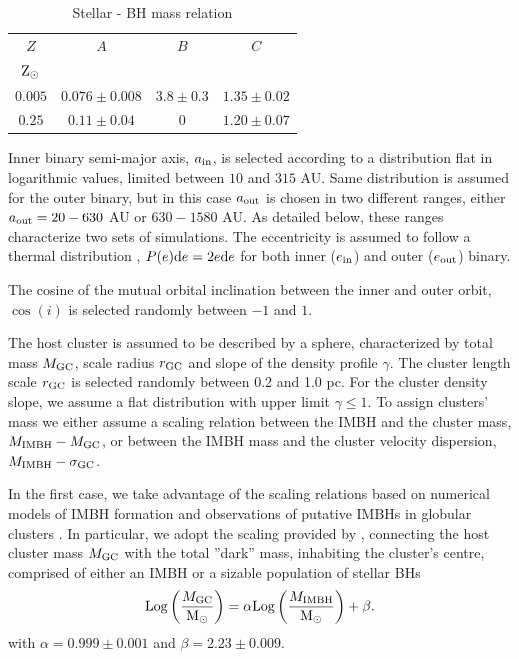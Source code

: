 \documentclass[twocolumn]{aastex62}
\newcommand{\Log}{{\rm Log}}
\newcommand{\Ms}{{\rm M}_\odot}
\newcommand{\Zs}{{\rm Z}_\odot}
\newcommand{\gc}{{\rm GC}}
\newcommand{\ibh}{{\rm IMBH}}
\newcommand{\inn}{{\rm in}}
\newcommand{\out}{{\rm out}}
\begin{document}
\begin{table}
    \centering
    \caption{Stellar - BH mass relation}
    \begin{tabular}{cccc}
        \hline
        \hline
        $Z$ & $A$ & $B$ & $C$ \\
        $\Zs$   &  & &  \\
    \hline    
        $0.005 $& $0.076\pm0.008$ & $3.8\pm0.3$ & $1.35\pm0.02$\\
        $0.25$  & $0.11\pm0.04$   & $0  $       & $1.20\pm0.07$\\
    \hline
    \end{tabular}
    \label{tab:t1}
\end{table}

Inner binary semi-major axis, $a_\inn$, is selected according to a distribution flat in logarithmic values, limited between $10$ and $315$ AU. Same distribution is assumed for the outer binary, but in this case $a_\out$ is chosen in two different ranges, either $a_\out=20-630$ AU or $630-1580$ AU. As detailed below, these ranges characterize two sets of simulations.
The eccentricity is assumed to follow a thermal distribution \citep{jeans19}, $P(e){\rm d}e = 2e{\rm d}e$ for both inner ($e_\inn$) and outer ($e_\out$) binary.

The cosine of the mutual orbital inclination between the inner and outer orbit, $\cos(i)$ is selected randomly between $-1$ and $1$.

The host cluster is assumed to be described by a \cite{Deh93} sphere, characterized by 
total mass $M_\gc$, scale radius $r_\gc$ and slope of the density profile $\gamma$.
The cluster length scale $r_\gc$ is selected randomly between 0.2 and 1.0 pc. For the cluster density slope, we assume a flat distribution with upper limit $\gamma \leq 1$.
To assign clusters' mass we either assume a scaling relation between the IMBH and the cluster mass, $M_\ibh - M_\gc$, or between the IMBH mass and the cluster velocity dispersion, $M_\ibh-\sigma_\gc$. 

In the first case, we take advantage of the scaling relations based on numerical models of IMBH formation and observations of putative IMBHs in globular clusters \citep{zwart02,Lutzgendorf13,AS16}. In particular, we adopt the scaling provided by \cite{AS16}, connecting the host cluster mass $M_\gc$ with the total ''dark'' mass, inhabiting the cluster's centre, comprised of either an IMBH or a sizable population of stellar BHs
\begin{equation}
\Log \left(\frac{M_\gc}{\Ms}\right) = \alpha \Log \left(\frac{M_\ibh}{\Ms}\right) + \beta.
\label{mcmibh}
\end{equation}
with $\alpha = 0.999 \pm 0.001$ and $\beta = 2.23 \pm 0.009$. 
\end{document}
